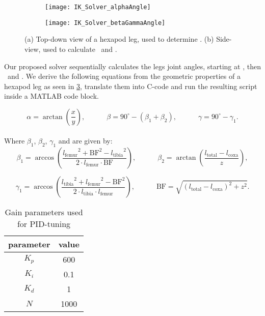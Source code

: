 \begin{figure}[!h]
	\begin{subfigure}{.5\textwidth} %
		\centering
		\texttt{[image: IK\_Solver\_alphaAngle]}  %
		\caption{}
		\label{figure: IK Solver Alpha Angle}
	\end{subfigure}
	\begin{subfigure}{.5\textwidth}
		\centering
		\texttt{[image: IK\_Solver\_betaGammaAngle]}  
		\caption{}
		\label{figure: IK Solver Beta/Gamma Angle}
	\end{subfigure}
	\caption[Angle derivation drawings]{(a) Top-down view of a hexapod leg, used to determine \textalpha. (b) Side-view, used to calculate \textbeta \ and \textgamma.}
	\label{figure: IK angle derivations}
\end{figure}

Our proposed solver sequentially calculates the legs joint angles, starting at \textalpha, then \textbeta \ and \textgamma.
We derive the following equations from the geometric properties of a hexapod leg as seen in \ref{figure: IK angle derivations}, translate them into C-code and run the resulting script inside a MATLAB code block.

\[
	\alpha = \arctan(\frac{x}{y}) ,\quad \quad \quad \beta = 90^{\circ} - (\beta_1 + \beta_2) ,\quad \quad \quad \gamma = 90^{\circ} - \gamma_1.
\]
\\
Where $\beta_1$, $\beta_2$, $\gamma_1$ and  are given by:
\[	
	\beta_1 = \arccos(\frac{{l_\text{femur}}^2 + \text{BF}^2 - {l_\text{tibia}}^2}  {2\cdot l_\text{femur} \cdot \text{BF}}) ,\quad \quad \quad \beta_2 = \arctan(\frac{ l_\text{total} - l_\text{coxa}} {z}),
\]

\[
	\gamma_1 = \arccos(\frac{{l_\text{tibia}}^2 + {l_\text{femur}}^2 - {\text{BF}}^2}  {2 \cdot {l_\text{tibia}} \cdot {l_\text{femur}}}) ,\quad \quad \quad \text{BF} = \sqrt{(l_\text{total} - l_\text{coxa})^2 + z^2}.
\]

\begin{table}[h!]
	\centering
	\begin{tabular}{| c | c |}
		\hline
		parameter & value\\
		\hline
		\hline
		$K_p$ & 600 \\
		
		$K_i$ & 0.1 \\
		
		$K_d$ & 1 \\
		
		$N$ & 1000 \\
		\hline
	\end{tabular}
	\caption{Gain parameters used for PID-tuning}
	\label{table: PID parameters}
\end{table}

